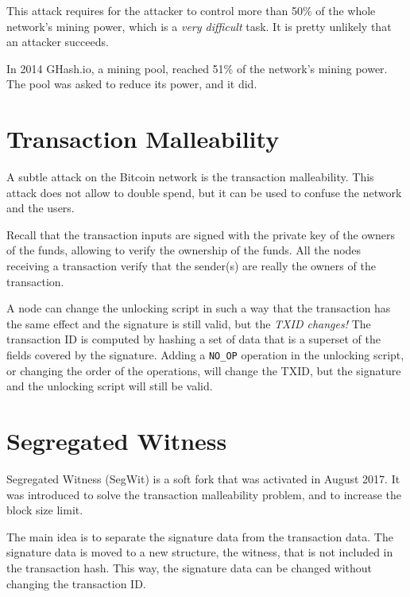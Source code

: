 This attack requires for the attacker to control more than 50\% of the whole network's mining power, which is a \textit{very difficult} task. It is pretty unlikely that an attacker succeeds.

In 2014 GHash.io, a mining pool, reached 51\% of the network's mining power. The pool was asked to reduce its power, and it did.

\section{Transaction Malleability}
A subtle attack on the Bitcoin network is the transaction malleability. This attack does not allow to double spend, but it can be used to confuse the network and the users.

Recall that the transaction inputs are signed with the private key of the owners of the funds, allowing to verify the ownership of the funds.
All the nodes receiving a transaction verify that the sender(s) are really the owners of the transaction.

A node can change the unlocking script in such a way that the transaction has the same effect and the signature is still valid, but the \textit{TXID changes!}
The transaction ID is computed by hashing a set of data that is a superset of the fields covered by the signature.
Adding a \texttt{NO\_OP} operation in the unlocking script, or changing the order of the operations, will change the TXID, but the signature and the unlocking script will still be valid.

\section{Segregated Witness}
Segregated Witness (SegWit) is a soft fork that was activated in August 2017. It was introduced to solve the transaction malleability problem, and to increase the block size limit.

The main idea is to separate the signature data from the transaction data. The signature data is moved to a new structure, the witness, that is not included in the transaction hash. This way, the signature data can be changed without changing the transaction ID.

